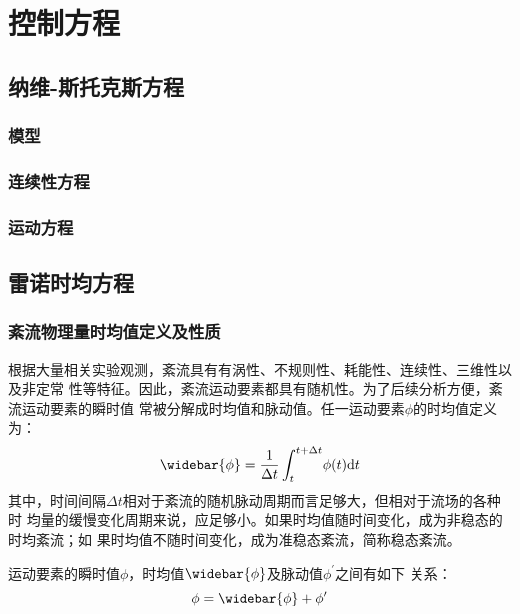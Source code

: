 \chapter{控制方程}
\section{纳维-斯托克斯方程}
\subsection{模型}
\subsection{连续性方程}
\subsection{运动方程}

\section{雷诺时均方程}
\subsection{紊流物理量时均值定义及性质}
根据大量相关实验观测，紊流具有有涡性、不规则性、耗能性、连续性、三维性以及非定常
性等特征。因此，紊流运动要素都具有随机性。为了后续分析方便，紊流运动要素的瞬时值
常被分解成时均值和脉动值。任一运动要素$\phi$的时均值定义为：
\begin{equation}
  \widebar{\phi}
  =
  \frac{1}{\Delta t}
  \int_{t}^{t+\Delta t}\!
  \phi(t)
  \mathrm{d}t
  \label{EqCGe_RA}
\end{equation}
其中，时间间隔$\Delta t$相对于紊流的随机脉动周期而言足够大，但相对于流场的各种时
均量的缓慢变化周期来说，应足够小。如果时均值随时间变化，成为非稳态的时均紊流；如
果时均值不随时间变化，成为准稳态紊流，简称稳态紊流。

运动要素的瞬时值$\phi$，时均值$\widebar{\phi}$及脉动值$\phi^{\prime}$之间有如下
关系：
\begin{equation}
  \phi = \widebar{\phi} + \phi^{\prime}
  \label{EqCGe_RA_Comp}
\end{equation}

